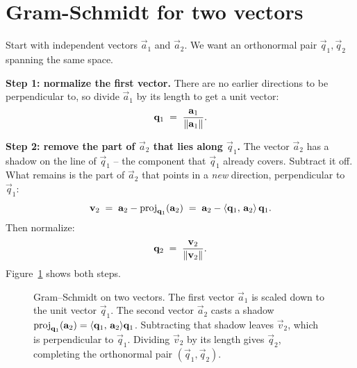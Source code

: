 \section{Gram-Schmidt for two vectors}

Start with independent vectors $\vec{a}_1$ and $\vec{a}_2$. We want an orthonormal
pair $\vec{q}_1,\vec{q}_2$ spanning the same space.

\textbf{Step 1: normalize the first vector.} There are no earlier directions to be
perpendicular to, so divide $\vec{a}_1$ by its length to get a unit vector:
\[
  \mathbf{q}_1 \;=\; \frac{\mathbf{a}_1}{\lVert\mathbf{a}_1\rVert}.
\]

\textbf{Step 2: remove the part of $\vec{a}_2$ that lies along $\vec{q}_1$.}
The vector $\vec{a}_2$ has a shadow on the line of $\vec{q}_1$ -- the component that
$\vec{q}_1$ already covers. Subtract it off. What remains is the part of
$\vec{a}_2$ that points in a \emph{new} direction, perpendicular to
$\vec{q}_1$:
\[
  \mathbf{v}_2 \;=\; \mathbf{a}_2 - \operatorname{proj}_{\mathbf{q}_1}(\mathbf{a}_2)
            \;=\; \mathbf{a}_2 - \langle \mathbf{q}_1,\, \mathbf{a}_2 \rangle\,\mathbf{q}_1.
\]
Then normalize:
\[
  \mathbf{q}_2 \;=\; \frac{\mathbf{v}_2}{\lVert\mathbf{v}_2\rVert}.
\]
Figure~\ref{ch20:gs2} shows both steps.

\begin{figure}[htbp]
\centering
{}
\caption{Gram--Schmidt on two vectors. The first vector $\vec{a}_1$ is scaled down to the unit vector $\vec{q}_1$.
The second vector $\vec{a}_2$ casts a shadow $\operatorname{proj}_{\mathbf{q}_1}(\mathbf{a}_2) = \langle \mathbf{q}_1,\, \mathbf{a}_2 \rangle\mathbf{q}_1$.
Subtracting that shadow leaves $\vec{v}_2$, which is perpendicular to $\vec{q}_1$. Dividing
$\vec{v}_2$ by its length gives $\vec{q}_2$, completing the orthonormal pair $(\vec{q}_1,\vec{q}_2)$.}
\label{ch20:gs2}
\end{figure}

